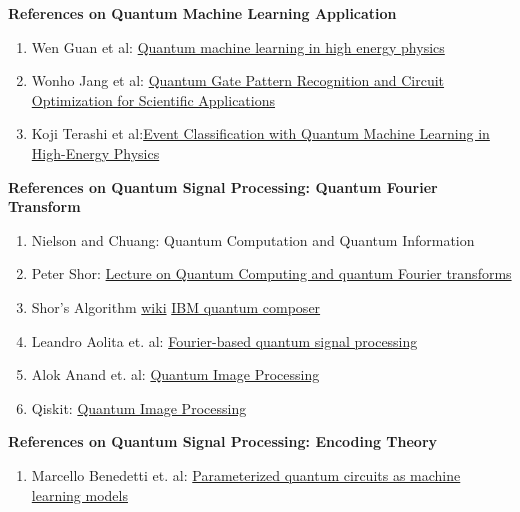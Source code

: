 \documentclass{article}
\begin{document}
\textbf{References on Quantum Machine Learning Application}
\begin{enumerate}
  \item Wen Guan et al: \href{https://iopscience.iop.org/article/10.1088/2632-2153/abc17d}{
    Quantum machine learning in high energy physics}
  \item Wonho Jang et al: \href{https://arxiv.org/abs/2102.10008}{
    Quantum Gate Pattern Recognition and Circuit Optimization for Scientific Applications}
  \item Koji Terashi et al:\href{https://link.springer.com/article/10.1007/s41781-020-00047-7}{Event Classification 
  with Quantum Machine Learning in High-Energy Physics }
\end{enumerate}

\textbf{References on Quantum Signal Processing: Quantum Fourier Transform}
\begin{enumerate}
  \item Nielson and Chuang: Quantum Computation and Quantum Information
  \item Peter Shor: \href{https://www.cl.cam.ac.uk/teaching/1920/QuantComp/Quantum_Computing_Lecture_9.pdf}{Lecture on Quantum Computing
  and quantum Fourier transforms}
  \item Shor's Algorithm \href{https://en.wikipedia.org/wiki/Shor%27s_algorithm}{wiki} \href{https://quantum-computing.ibm.com/composer/docs/iqx/guide/shors-algorithm}{IBM quantum composer} 
  \item Leandro Aolita et. al: \href{https://arxiv.org/abs/2206.02826}{Fourier-based quantum signal processing}
  \item Alok Anand et. al: \href{https://arxiv.org/pdf/2203.01831.pdf}{Quantum Image Processing }
  \item Qiskit: \href{https://qiskit.org/textbook/ch-applications/image-processing-frqi-neqr.html}{Quantum Image Processing}
\end{enumerate}

\textbf{References on Quantum Signal Processing: Encoding Theory }
\begin{enumerate}
  \item Marcello Benedetti et. al: \href{https://iopscience.iop.org/article/10.1088/2058-9565/ab4eb5}{Parameterized quantum circuits as machine learning models
  }
\end{enumerate}



\end{document}
